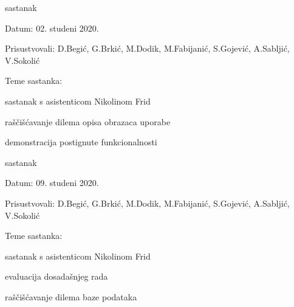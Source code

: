 \begin{packed_enum}
			\item  sastanak
			\item[] \begin{packed_item}
				\item Datum: 02. studeni 2020.
				\item Prisustvovali: D.Begić, G.Brkić, M.Dodik, M.Fabijanić, S.Gojević, A.Sabljić, V.Sokolić
				\item Teme sastanka:
				\begin{packed_item}
					\item  sastanak s asistenticom Nikolinom Frid
					\item  raščišćavanje dilema opisa obrazaca uporabe
					\item demonstracija postignute funkcionalnosti
				\end{packed_item}
			\end{packed_item}
		
			\item  sastanak
			\item[] \begin{packed_item}
				\item Datum: 09. studeni 2020.
				\item Prisustvovali: D.Begić, G.Brkić, M.Dodik, M.Fabijanić, S.Gojević, A.Sabljić, V.Sokolić
				\item Teme sastanka:
				\begin{packed_item}
					\item  sastanak s asistenticom Nikolinom Frid
					\item  evaluacija dosadašnjeg rada
					\item raščišćavanje dilema baze podataka
				\end{packed_item}
			\end{packed_item}
		

\end{packed_enum}
